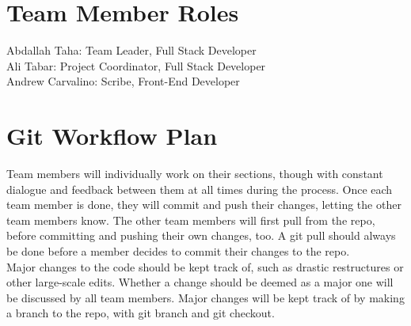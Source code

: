 \documentclass{article}
\begin{document}
\section{Team Member Roles}
Abdallah Taha: Team Leader, Full Stack Developer \\
Ali Tabar: Project Coordinator, Full Stack Developer \\
Andrew Carvalino: Scribe, Front-End Developer \\

\section{Git Workflow Plan}

Team members will individually work on their sections, though with constant dialogue and feedback between them at all times during the process. Once each team member is done, they will commit and push their changes, letting the other team members know. The other team members will first pull from the repo, before committing and pushing their own changes, too. A git pull should always be done before a member decides to commit their changes to the repo.\\
Major changes to the code should be kept track of, such as drastic restructures or other large-scale edits. Whether a change should be deemed as a major one will be discussed by all team members. Major changes will be kept track of by making a branch to the repo, with git branch and git checkout.
\end{document}
